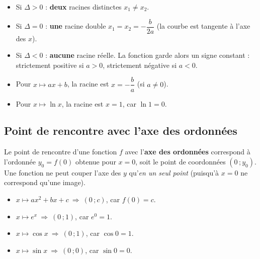 \documentclass[11pt,a4paper]{article}
\begin{document}
\begin{attention}
\begin{itemize}[leftmargin=1.5em,topsep=2pt]
  \item Si $\Delta>0$ : \textbf{deux} racines distinctes $x_1\neq x_2$.
  \item Si $\Delta=0$ : \textbf{une} racine double $x_1=x_2=-\dfrac{b}{2a}$
        (la courbe est tangente à l'axe des $x$).
  \item Si $\Delta<0$ : \textbf{aucune} racine réelle. La fonction garde alors un signe
        constant : strictement positive si $a>0$, strictement négative si $a<0$.
\end{itemize}
\end{attention}

\begin{exemple}
\begin{itemize}[leftmargin=1.5em,topsep=2pt]
  \item Pour $x\mapsto ax+b$, la racine est $x=-\dfrac{b}{a}$ (si $a\neq 0$).
  \item Pour $x\mapsto \ln x$, la racine est $x=1$, car $\ln 1 = 0$.
\end{itemize}
\end{exemple}

\subsection{Point de rencontre avec l'axe des ordonnées}

\begin{definition}
Le point de rencontre d'une fonction $f$ avec l'\textbf{axe des ordonnées} correspond à
l'ordonnée $y_0=f(0)$ obtenue pour $x=0$, soit le point de coordonnées $(0\,;y_0)$.
Une fonction ne peut couper l'axe des $y$ qu'\emph{en un seul point} (puisqu'à $x=0$ ne
correspond qu'une image).
\end{definition}

\begin{exemple}
\begin{itemize}[leftmargin=1.5em,topsep=2pt]
  \item $x\mapsto ax^2+bx+c \ \Rightarrow\ (0\,;c)$, car $f(0)=c$.
  \item $x\mapsto e^{x} \ \Rightarrow\ (0\,;1)$, car $e^0=1$.
  \item $x\mapsto \cos x \ \Rightarrow\ (0\,;1)$, car $\cos 0=1$.
  \item $x\mapsto \sin x \ \Rightarrow\ (0\,;0)$, car $\sin 0=0$.
\end{itemize}
\end{exemple}
\end{document}
